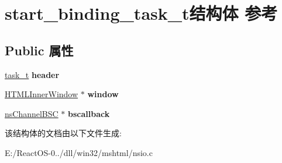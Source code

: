\hypertarget{structstart__binding__task__t}{}\section{start\+\_\+binding\+\_\+task\+\_\+t结构体 参考}
\label{structstart__binding__task__t}
\subsection*{Public 属性}
\begin{DoxyCompactItemize}
\item 
\mbox{\label{structstart__binding__task__t_ac5cf96e6e17a14f8eb1f020ca995606f}} 
\hyperlink{structtask__t}{task\+\_\+t} {\bfseries header}
\item 
\mbox{\label{structstart__binding__task__t_af4a21ecca40e6170aa825f1a39fcf0b1}} 
\hyperlink{struct_h_t_m_l_inner_window}{H\+T\+M\+L\+Inner\+Window} $\ast$ {\bfseries window}
\item 
\mbox{\label{structstart__binding__task__t_ae92899941aea0aa8dc99808f5b6d99a8}} 
\hyperlink{structns_channel_b_s_c}{ns\+Channel\+B\+SC} $\ast$ {\bfseries bscallback}
\end{DoxyCompactItemize}


该结构体的文档由以下文件生成\+:\begin{DoxyCompactItemize}
\item 
E\+:/\+React\+O\+S-\/0../dll/win32/mshtml/nsio.\+c\end{DoxyCompactItemize}
